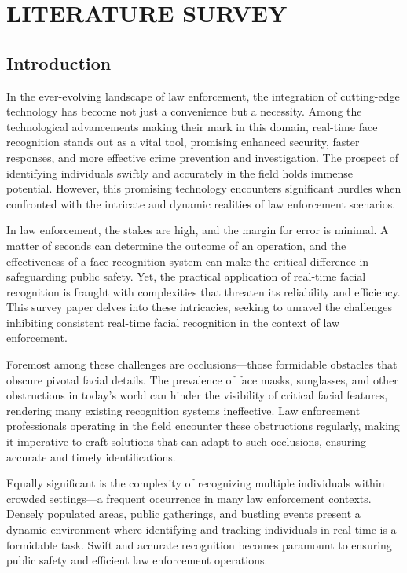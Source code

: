 \chapter{LITERATURE SURVEY}

\section{Introduction} \label{section:intro}
In the ever-evolving landscape of law enforcement, the integration of cutting-edge technology has become not just a convenience but a necessity. Among the technological advancements making their mark in this domain, real-time face recognition stands out as a vital tool, promising enhanced security, faster responses, and more effective crime prevention and investigation. The prospect of identifying individuals swiftly and accurately in the field holds immense potential. However, this promising technology encounters significant hurdles when confronted with the intricate and dynamic realities of law enforcement scenarios.

In law enforcement, the stakes are high, and the margin for error is minimal. A matter of seconds can determine the outcome of an operation, and the effectiveness of a face recognition system can make the critical difference in safeguarding public safety. Yet, the practical application of real-time facial recognition is fraught with complexities that threaten its reliability and efficiency. This survey paper delves into these intricacies, seeking to unravel the challenges inhibiting consistent real-time facial recognition in the context of law enforcement.

Foremost among these challenges are occlusions—those formidable obstacles that obscure pivotal facial details. The prevalence of face masks, sunglasses, and other obstructions in today's world can hinder the visibility of critical facial features, rendering many existing recognition systems ineffective. Law enforcement professionals operating in the field encounter these obstructions regularly, making it imperative to craft solutions that can adapt to such occlusions, ensuring accurate and timely identifications.

Equally significant is the complexity of recognizing multiple individuals within crowded settings—a frequent occurrence in many law enforcement contexts. Densely populated areas, public gatherings, and bustling events present a dynamic environment where identifying and tracking individuals in real-time is a formidable task. Swift and accurate recognition becomes paramount to ensuring public safety and efficient law enforcement operations.

